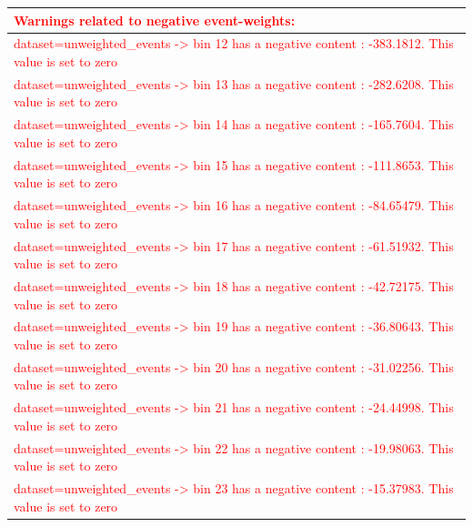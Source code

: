 \documentclass[a4paper, 10pt]{article}
\begin{document}
\begin{table}[H]
  \begin{center}
    \begin{tabular}{|m{140.0mm}|}
      \hline
      {\cellcolor{white}\textcolor{red}{Warnings related to negative event-weights:}}\\
      \hline
      {\cellcolor{white}\textcolor{red}{dataset=unweighted\_events -> bin 12 has a negative content : -383.1812. This value is set to zero}}\\
      \hline
      {\cellcolor{white}\textcolor{red}{dataset=unweighted\_events -> bin 13 has a negative content : -282.6208. This value is set to zero}}\\
      \hline
      {\cellcolor{white}\textcolor{red}{dataset=unweighted\_events -> bin 14 has a negative content : -165.7604. This value is set to zero}}\\
      \hline
      {\cellcolor{white}\textcolor{red}{dataset=unweighted\_events -> bin 15 has a negative content : -111.8653. This value is set to zero}}\\
      \hline
      {\cellcolor{white}\textcolor{red}{dataset=unweighted\_events -> bin 16 has a negative content : -84.65479. This value is set to zero}}\\
      \hline
      {\cellcolor{white}\textcolor{red}{dataset=unweighted\_events -> bin 17 has a negative content : -61.51932. This value is set to zero}}\\
      \hline
      {\cellcolor{white}\textcolor{red}{dataset=unweighted\_events -> bin 18 has a negative content : -42.72175. This value is set to zero}}\\
      \hline
      {\cellcolor{white}\textcolor{red}{dataset=unweighted\_events -> bin 19 has a negative content : -36.80643. This value is set to zero}}\\
      \hline
      {\cellcolor{white}\textcolor{red}{dataset=unweighted\_events -> bin 20 has a negative content : -31.02256. This value is set to zero}}\\
      \hline
      {\cellcolor{white}\textcolor{red}{dataset=unweighted\_events -> bin 21 has a negative content : -24.44998. This value is set to zero}}\\
      \hline
      {\cellcolor{white}\textcolor{red}{dataset=unweighted\_events -> bin 22 has a negative content : -19.98063. This value is set to zero}}\\
      \hline
      {\cellcolor{white}\textcolor{red}{dataset=unweighted\_events -> bin 23 has a negative content : -15.37983. This value is set to zero}}\\

\end{tabular}
\end{center}
\end{table}
\end{document}
